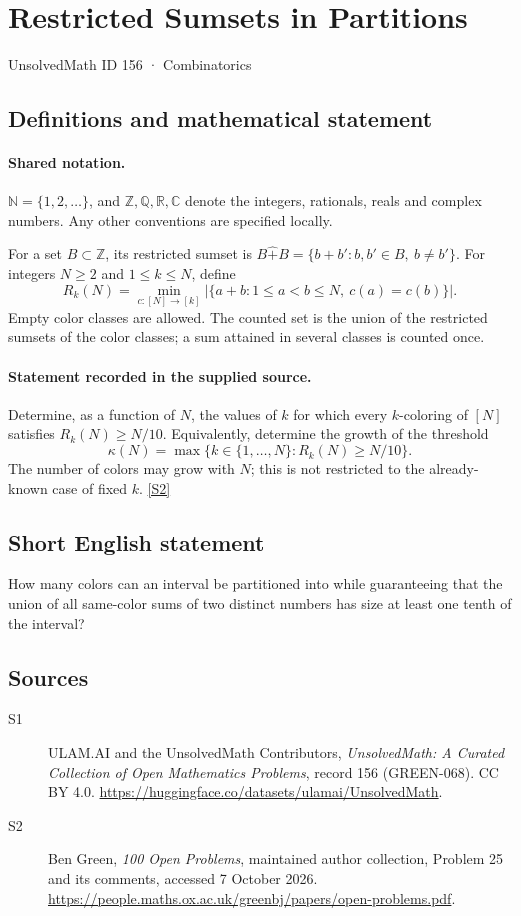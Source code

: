 \documentclass[11pt]{article}
\newcommand{\sref}[2]{\hyperlink{source:#1:#2}{[S#2]}}
\begin{document}
\setcounter{section}{155}
\section{Restricted Sumsets in Partitions}\label{156}
{\small\sffamily UnsolvedMath ID 156 · Combinatorics}
\subsection{Definitions and mathematical statement}

\paragraph{Shared notation.}$\mathbb N=\{1,2,\ldots\}$, and $\mathbb Z,\mathbb Q,\mathbb R,\mathbb C$ denote the integers, rationals, reals and complex numbers. Any other conventions are specified locally.


For a set $B\subset\mathbb Z$, its restricted sumset is $B\widehat{+}B=\{b+b':b,b'\in B,\ b\ne b'\}$. For integers $N\geq2$ and $1\leq k\leq N$, define
\[
 R_k(N)=\min_{c:[N]\to[k]}
 \bigl|\{a+b:1\leq a<b\leq N,\ c(a)=c(b)\}\bigr|.
\]
Empty color classes are allowed. The counted set is the union of the restricted sumsets of the color classes; a sum attained in several classes is counted once.
\paragraph{Statement recorded in the supplied source.}
Determine, as a function of $N$, the values of $k$ for which every $k$-coloring of $[N]$ satisfies $R_k(N)\geq N/10$. Equivalently, determine the growth of the threshold
\[
 \kappa(N)=\max\{k\in\{1,\ldots,N\}:R_k(N)\geq N/10\}.
\]
The number of colors may grow with $N$; this is not restricted to the already-known case of fixed $k$. \sref{156}{2}
\subsection{Short English statement}
How many colors can an interval be partitioned into while guaranteeing that the union of all same-color sums of two distinct numbers has size at least one tenth of the interval?
\subsection{Sources}
\begin{description}
\item[\hypertarget{source:156:1}{S1}] ULAM.AI and the UnsolvedMath Contributors, \emph{UnsolvedMath: A Curated Collection of Open Mathematics Problems}, record 156 (GREEN-068). CC BY 4.0. \url{https://huggingface.co/datasets/ulamai/UnsolvedMath}.
\item[\hypertarget{source:156:2}{S2}] Ben Green, \emph{100 Open Problems}, maintained author collection, Problem 25 and its comments, accessed 7 October 2026. \url{https://people.maths.ox.ac.uk/greenbj/papers/open-problems.pdf}.
\end{description}
\label{end:156}
\end{document}
